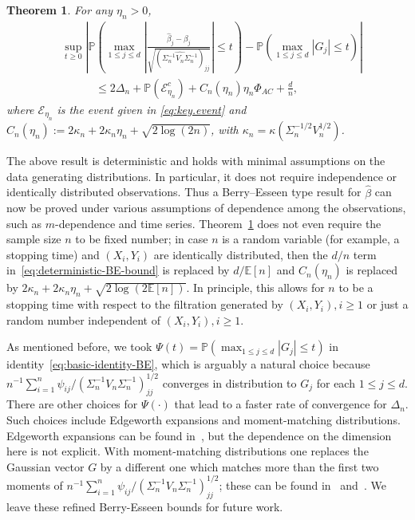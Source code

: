 \documentclass[11pt]{article}
\newtheorem{theorem}{Theorem}
\begin{document}
\begin{theorem}\label{thm:Berry-Esseen-OLS}
For any $\eta_n > 0$,
\begin{equation}\label{eq:deterministic-BE-bound}
\begin{split}
&\sup_{t\ge0}\left|\mathbb{P}\left(\max_{1\le j\le d}\left|\frac{\widehat{\beta}_j - \beta_j}{\sqrt{(\widehat{\Sigma_n^{-1}V_n\Sigma_n^{-1}})_{jj}}}\right| \le t\right) - \mathbb{P}\left(\max_{1\le j\le d}|G_j| \le t\right)\right|
\\ 
&\quad\qquad
\le 2\Delta_n + \mathbb{P}(\mathcal{E}_{\eta_n}^c) + C_n(\eta_n)\eta_n\Phi_{AC} + \frac{d}{n},
\end{split}
\end{equation}
where $\mathcal{E}_{\eta_n}$ is the event given in \eqref{eq:key.event} and $C_n(\eta_n) := 2 \kappa_n + 2 \kappa_n \eta_n + \sqrt{2\log(2  n)}$, with $\kappa_n = \kappa(\Sigma_n^{-1/2}V_n^{1/2}) $.
\end{theorem}

The above result is deterministic and holds with minimal assumptions on the data generating distributions. In particular, it does not require independence or identically distributed observations. Thus a Berry--Esseen type result for $\widehat{\beta}$ can now be proved under various assumptions of dependence among the observations, such as $m$-dependence and time series. Theorem~\ref{thm:Berry-Esseen-OLS} does not even require the sample size $n$ to be fixed number; in case $n$ is a random variable (for example, a stopping time) and $(X_i, Y_i)$ are identically distributed, then the $d/n$ term in~\eqref{eq:deterministic-BE-bound} is replaced by $d/\mathbb{E}[n]$ and $C_n(\eta_n)$ is replaced by $2\kappa_n + 2\kappa_n\eta_n + \sqrt{2\log(2\mathbb{E}[n])}$. In principle, this allows for $n$ to be a stopping time with respect to the filtration generated by $(X_i, Y_i), i\ge1$ or just a random number independent of $(X_i, Y_i), i\ge1$.%

As mentioned before, we took $\Psi(t) = \mathbb{P}(\max_{1\le j\le d}|G_j| \le t)$ in identity~\eqref{eq:basic-identity-BE}, which is arguably a natural choice because $n^{-1}\sum_{i=1}^n \psi_{ij}/(\Sigma_n^{-1}V_n\Sigma_n^{-1})_{jj}^{1/2}$ converges in distribution to $G_j$ for each $1\le j\le d$. There are other choices for $\Psi(\cdot)$ that lead to a faster rate of convergence for $\Delta_n$. Such choices include Edgeworth expansions and moment-matching distributions. Edgeworth expansions can be found in~\citet[Theorem 20.1]{bhattacharya2010normal}, but the dependence on the dimension here is not explicit. With moment-matching distributions one replaces the Gaussian vector $G$ by a different one which matches more than the first two moments of $n^{-1}\sum_{i=1}^n \psi_{ij}/(\Sigma_n^{-1}V_n\Sigma_n^{-1})_{jj}^{1/2}$; these can be found in~\cite{boutsikas2015penultimate} and~\cite{zhilova2016non}. We leave these refined Berry-Esseen bounds for future work.
\end{document}
